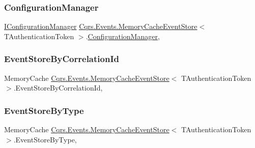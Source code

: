 \subsubsection{\texorpdfstring{Configuration\+Manager}{ConfigurationManager}}
{\footnotesize\ttfamily \hyperlink{interfaceCqrs_1_1Configuration_1_1IConfigurationManager}{I\+Configuration\+Manager} \hyperlink{classCqrs_1_1Events_1_1MemoryCacheEventStore}{Cqrs.\+Events.\+Memory\+Cache\+Event\+Store}$<$ T\+Authentication\+Token $>$.\hyperlink{classCqrs_1_1Configuration_1_1ConfigurationManager}{Configuration\+Manager}\hspace{0.3cm}{\ttfamily [get]}, {\ttfamily [protected]}}

\mbox{\label{classCqrs_1_1Events_1_1MemoryCacheEventStore_a6f317c9f46dfd65d7398b010f484b687_a6f317c9f46dfd65d7398b010f484b687}} 
\subsubsection{\texorpdfstring{Event\+Store\+By\+Correlation\+Id}{EventStoreByCorrelationId}}
{\footnotesize\ttfamily Memory\+Cache \hyperlink{classCqrs_1_1Events_1_1MemoryCacheEventStore}{Cqrs.\+Events.\+Memory\+Cache\+Event\+Store}$<$ T\+Authentication\+Token $>$.Event\+Store\+By\+Correlation\+Id\hspace{0.3cm}{\ttfamily [get]}, {\ttfamily [protected]}}

\mbox{\label{classCqrs_1_1Events_1_1MemoryCacheEventStore_afc04a822655f1e23a1cce8ed1a40627f_afc04a822655f1e23a1cce8ed1a40627f}} 
\subsubsection{\texorpdfstring{Event\+Store\+By\+Type}{EventStoreByType}}
{\footnotesize\ttfamily Memory\+Cache \hyperlink{classCqrs_1_1Events_1_1MemoryCacheEventStore}{Cqrs.\+Events.\+Memory\+Cache\+Event\+Store}$<$ T\+Authentication\+Token $>$.Event\+Store\+By\+Type\hspace{0.3cm}{\ttfamily [get]}, {\ttfamily [protected]}}

